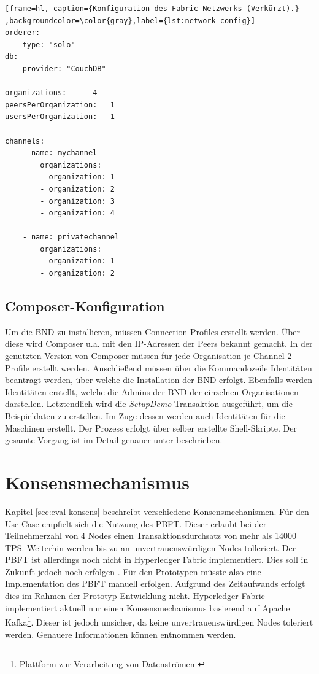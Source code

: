 \begin{lstfloat}
\begin{lstlisting}[frame=hl, caption={Konfiguration des Fabric-Netzwerks (Verkürzt).} ,backgroundcolor=\color{gray},label={lst:network-config}]
orderer:
    type: "solo"
db:
    provider: "CouchDB"

organizations:      4
peersPerOrganization:   1
usersPerOrganization:   1

channels:
    - name: mychannel
        organizations:
        - organization: 1
        - organization: 2
        - organization: 3
        - organization: 4

    - name: privatechannel
        organizations:
        - organization: 1
        - organization: 2
\end{lstlisting} 
\end{lstfloat}

\subsection{Composer-Konfiguration}
Um die \acs{BND} zu installieren, müssen Connection Profiles erstellt werden. Über diese wird Composer u.a. mit den IP-Adressen der Peers bekannt gemacht. In der genutzten Version von Composer müssen für jede Organisation je Channel 2 Profile erstellt werden. Anschließend müssen über die Kommandozeile Identitäten beantragt werden, über welche die Installation der \acs{BND} erfolgt. Ebenfalls werden Identitäten erstellt, welche die Admins der \acs{BND} der einzelnen Organisationen darstellen. Letztendlich wird die \textit{SetupDemo}-Transaktion ausgeführt, um die Beispieldaten zu erstellen. Im Zuge dessen werden auch Identitäten für die Maschinen erstellt. Der Prozess erfolgt über selber erstellte Shell-Skripte. Der gesamte Vorgang ist im Detail genauer unter \cite{HyperledgerComposerTeamMultiOrgDeployment} beschrieben.

\section{Konsensmechanismus}
\label{sec:consensus-choose}
Kapitel \ref{sec:eval-konsens} beschreibt verschiedene Konsensmechanismen. Für den Use-Case empfielt sich die Nutzung des PBFT. Dieser erlaubt bei der Teilnehmerzahl von 4 Nodes einen Transaktionsdurchsatz von mehr als 14000 TPS. Weiterhin werden bis zu  an unvertrauenswürdigen Nodes tolleriert. Der PBFT ist allerdings noch nicht in Hyperledger Fabric implementiert. Dies soll in Zukunft jedoch noch erfolgen \cite{HyperledgerFabricTeamPluggableConsensusImplementations}. Für den Prototypen müsste also eine Implementation des PBFT manuell erfolgen. Aufgrund des Zeitaufwands erfolgt dies im Rahmen der Prototyp-Entwicklung nicht. Hyperledger Fabric implementiert aktuell nur einen Konsensmechanismus basierend auf Apache Kafka\footnote{Plattform zur Verarbeitung von Datenströmen \cite{ApacheIntroductionApacheKafka}}. Dieser ist jedoch unsicher, da keine unvertrauenswürdigen Nodes toleriert werden. Genauere Informationen können \cite{CachinBlockchainConsensusProtocols2017} entnommen werden.

